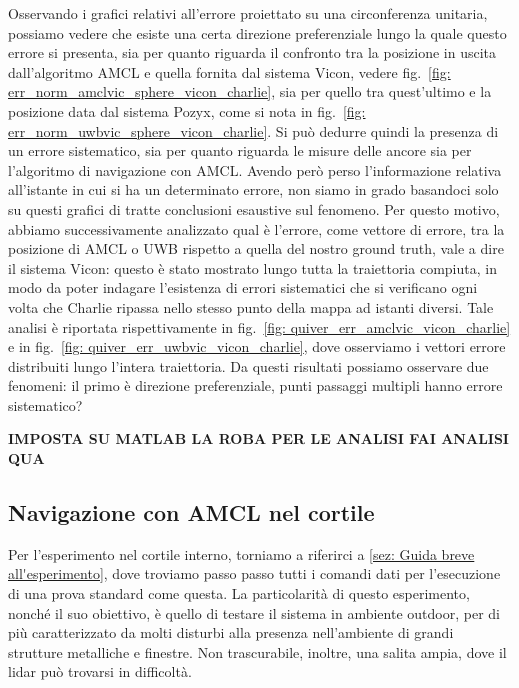 Osservando i grafici relativi all'errore proiettato su una circonferenza unitaria, possiamo vedere che esiste una certa direzione 
preferenziale lungo la quale questo errore si presenta, sia per quanto riguarda il confronto tra la posizione in uscita dall'algoritmo AMCL e 
quella fornita dal sistema Vicon, vedere fig.~\ref{fig: err_norm_amclvic_sphere_vicon_charlie}, sia per quello tra quest'ultimo e la posizione data dal sistema Pozyx, come si nota in fig.~\ref{fig: err_norm_uwbvic_sphere_vicon_charlie}. 
Si può dedurre quindi la presenza di un errore sistematico, sia per quanto riguarda le misure delle ancore sia per l'algoritmo di navigazione con AMCL. Avendo però perso l'informazione relativa all'istante in cui si ha un determinato errore, non siamo in grado basandoci solo su questi grafici di tratte conclusioni esaustive sul fenomeno. Per questo motivo, abbiamo successivamente analizzato qual è l'errore, come vettore di errore, tra la posizione di AMCL o UWB rispetto a quella del nostro ground truth, vale a dire il sistema Vicon: questo è stato mostrato lungo tutta la traiettoria compiuta, in modo da poter indagare l'esistenza di errori sistematici che si verificano ogni volta che Charlie ripassa nello stesso punto della mappa ad istanti diversi. 
Tale analisi è riportata rispettivamente in fig.~\ref{fig: quiver_err_amclvic_vicon_charlie} e in fig.~\ref{fig: quiver_err_uwbvic_vicon_charlie}, dove osserviamo i vettori errore distribuiti lungo l'intera traiettoria. Da questi risultati possiamo osservare due fenomeni: il primo è direzione preferenziale, punti passaggi multipli hanno errore sistematico?

\textbf{IMPOSTA SU MATLAB LA ROBA PER LE ANALISI
	FAI ANALISI QUA}



\subsection{Navigazione con AMCL nel cortile}
Per l'esperimento nel cortile interno, torniamo a riferirci a \ref{sez: Guida breve all'esperimento}, dove troviamo passo passo tutti i comandi dati per 
l'esecuzione di una prova standard come questa.
La particolarità di questo esperimento, nonché il suo obiettivo, è quello di testare il sistema in ambiente outdoor, per di più caratterizzato da molti disturbi 
alla presenza nell'ambiente di grandi strutture metalliche e finestre. Non trascurabile, inoltre, una salita ampia, dove il lidar può trovarsi in difficoltà.

